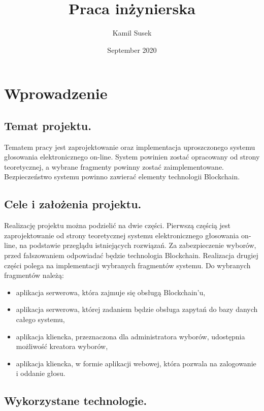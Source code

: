 \documentclass[a4paper,13pt]{report}
\begin{document}
\begin{titlepage}

\title{Praca inżynierska}
\author{Kamil Susek}
\date{September 2020}

\maketitle
\end{titlepage}
\chapter{Wprowadzenie}
\section{Temat projektu.}
Tematem pracy jest zaprojektowanie oraz implementacja uproszczonego systemu głosowania elektronicznego on-line. System powinien zostać opracowany od strony teoretycznej, a wybrane fragmenty powinny zostać zaimplementowane. Bezpieczeństwo systemu powinno zawierać elementy technologii Blockchain.
\section{Cele i założenia projektu.}
Realizację projektu można podzielić na dwie części. Pierwszą częścią jest zaprojektowanie od strony teoretycznej systemu elektronicznego głosowania on-line, na podstawie przeglądu istniejących rozwiązań. Za zabezpieczenie wyborów, przed fałszowaniem odpowiadać będzie technologia Blockchain. Realizacja drugiej części polega na implementacji wybranych fragmentów systemu.
Do wybranych fragmentów należą: 
\begin{itemize}
    \item aplikacja serwerowa, która zajmuje się obsługą Blockchain'u,
    \item aplikacja serwerowa, której zadaniem będzie obsługa zapytań do bazy danych całego systemu, 
    \item aplikacja kliencka, przeznaczona dla administratora wyborów, udostępnia możliwość kreatora wyborów,
    \item aplikacja kliencka, w formie aplikacji webowej, która pozwala na zalogowanie i  oddanie głosu.
\end{itemize}
\section{Wykorzystane technologie.}


\newpage
\end{document}

